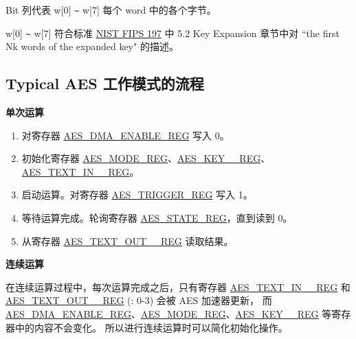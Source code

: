 \documentclass[main\_\_CN.tex]{subfiles}
\begin{document}
\begin{landscape}
\begin{threeparttable}
\begin{tablenotes}
\item[1] Bit 列代表 w[0] \verb+~+ w[7] 每个 word 中的各个字节。
\item[2] w[0] \verb+~+ w[7] 符合标准 \href{https://nvlpubs.nist.gov/nistpubs/FIPS/NIST.FIPS.197.pdf}{NIST FIPS 197} 中 5.2 Key Expansion 章节中对 ``the first Nk words of the expanded key" 的描述。
\end{tablenotes}
\end{threeparttable}

\end{landscape}  
\restoregeometry

\subsection{Typical AES 工作模式的流程 }

\textbf{单次运算}

\begin{enumerate}
    \item 对寄存器 \hyperref[regdesc:AESDMAENABLEREG]{AES\_DMA\_ENABLE\_REG} 写入 0。
    \item 初始化寄存器 \hyperref[regdesc:AESMODEREG]{AES\_MODE\_REG}、\hyperref[regdesc:AESKEYnREG]{AES\_KEY\_\_REG}、\hyperref[regdesc:AESTEXTINnREG]{AES\_TEXT\_IN\_\_REG}。
    \item 启动运算。对寄存器 \hyperref[regdesc:AESTRIGGERREG]{AES\_TRIGGER\_REG} 写入 1。
    \item 等待运算完成。轮询寄存器 \hyperref[regdesc:AESSTATEREG]{AES\_STATE\_REG}，直到读到 0。
    \item 从寄存器 \hyperref[regdesc:AESTEXTOUTnREG]{AES\_TEXT\_OUT\_\_REG} 读取结果。
\end{enumerate}

\textbf{连续运算}

在连续运算过程中，每次运算完成之后，只有寄存器 \hyperref[regdesc:AESTEXTINnREG]{AES\_TEXT\_IN\_\_REG} 和 \hyperref[regdesc:AESTEXTOUTnREG]{AES\_TEXT\_OUT\_\_REG} (: 0-3) 会被 AES 加速器更新，
而 \hyperref[regdesc:AESDMAENABLEREG]{AES\_DMA\_ENABLE\_REG}、\hyperref[regdesc:AESMODEREG]{AES\_MODE\_REG}、\hyperref[regdesc:AESKEYnREG]{AES\_KEY\_\_REG} 等寄存器中的内容不会变化。
所以进行连续运算时可以简化初始化操作。
\end{document}
